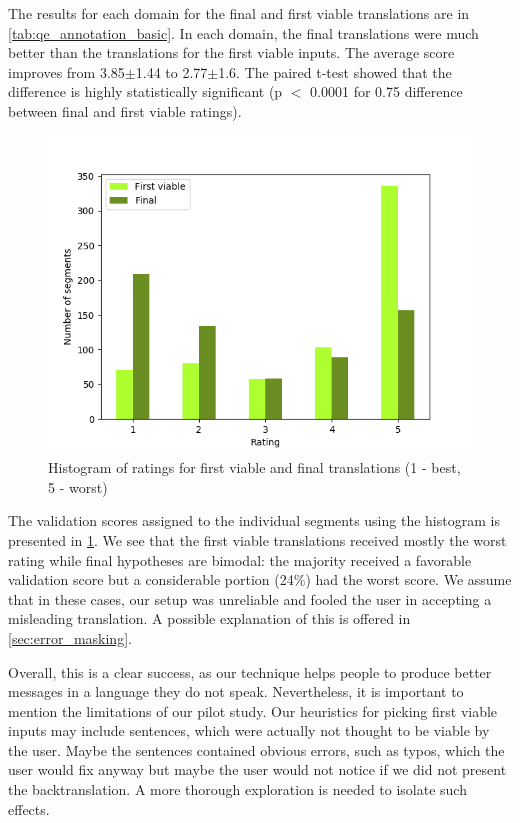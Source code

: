 The results for each domain for the final and first viable translations are in \cref{tab:qe_annotation_basic}. In each domain, the final translations were much better than the translations for the first viable inputs. The average score improves from 3.85$\pm$1.44 to 2.77$\pm$1.6. The paired t-test showed that the difference is highly statistically significant (p $<$ 0.0001 for 0.75 difference between final and first viable ratings).

\begin{figure}[ht]
    \centering
    \includegraphics[width=0.8\linewidth]{img/experiment/qa_buckets.png}
    \caption{\label{fig:qa_buckets} Histogram of ratings for first viable and final translations (1 - best, 5 - worst)}
\end{figure}

The validation scores assigned to the individual segments using the histogram is presented in \cref{fig:qa_buckets}. We see that the first viable translations received mostly the worst rating while final hypotheses are bimodal: the majority received a favorable validation score but a considerable portion (24\%) had the worst score. We assume that in these cases, our setup was unreliable and fooled the user in accepting a misleading translation. A possible explanation of this is offered in \cref{sec:error_masking}.

Overall, this is a clear success, as our technique helps people to produce better messages in a language they do not speak. Nevertheless, it is important to mention the limitations of our pilot study. Our heuristics for picking first viable inputs may include sentences, which were actually not thought to be viable by the user. Maybe the sentences contained obvious errors, such as typos, which the user would fix anyway but maybe the user would not notice if we did not present the backtranslation. A more thorough exploration is needed to isolate such effects.

